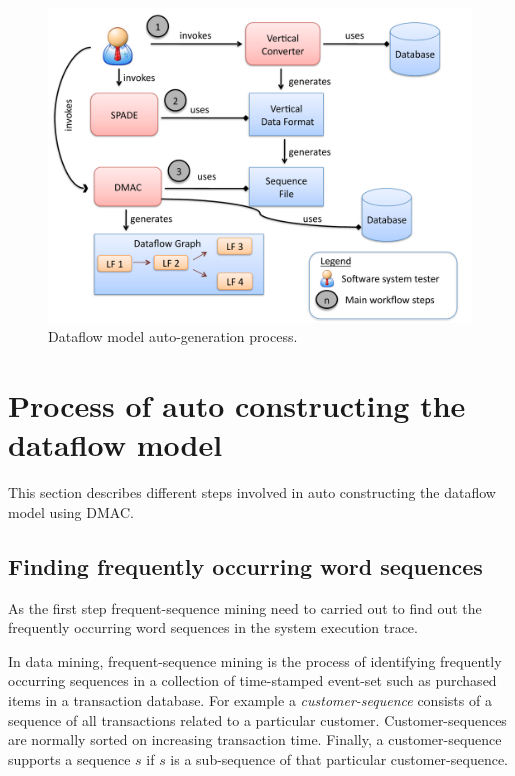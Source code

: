 \begin{figure}[htbp]
  \centering
  \includegraphics[scale=0.7]{analysis/dmac.pdf}
  \caption{Dataflow model auto-generation process.}
  \label{fig:dmac}
\end{figure}

\section{Process of auto constructing the dataflow model}
\label{sec:dmac-process}

This section describes different steps involved in auto constructing the 
dataflow model using DMAC.

\subsection{Finding frequently occurring word sequences}
\label{sec:frequent-mining}

As the first step frequent-sequence mining need to carried 
out to find out the frequently occurring word sequences 
in the system execution trace.

In data mining, frequent-sequence mining is the process of 
identifying frequently occurring sequences in a 
collection of time-stamped event-set such as purchased items 
in a transaction database. For example a \textit{customer-sequence} consists 
of a sequence of all transactions related to a particular 
customer. Customer-sequences are normally sorted on increasing 
transaction time. Finally, a customer-sequence supports a sequence 
$s$ if $s$ is a sub-sequence of that particular 
customer-sequence. 

